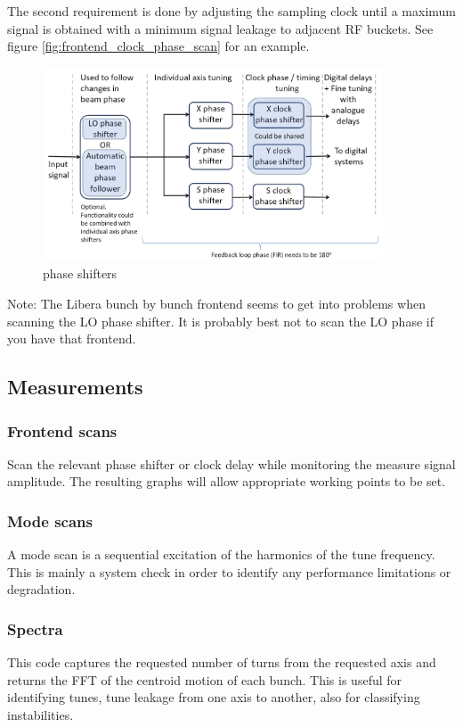 \documentclass{report}
\begin{document}
The second requirement is done by adjusting the sampling clock until a maximum signal is obtained with a minimum signal leakage to adjacent RF buckets. See figure \ref{fig:frontend_clock_phase_scan} for an example.
\begin{figure}[hbt]
    \centering
        \includegraphics[width=0.9\textwidth]{phase_shifters_overview.png}
        \caption{phase shifters}
        \label{fig:phase_shifters}
\end{figure}


Note: The Libera bunch by bunch frontend seems to get into problems when scanning the LO phase shifter. It is probably best not to scan the LO phase if you have that frontend.
\clearpage
\subsection{Measurements}
\subsubsection{Frontend scans}
Scan the relevant phase shifter or clock delay while monitoring the measure signal amplitude. The resulting graphs will allow appropriate working points to be set.

\subsubsection{Mode scans}
A mode scan is a sequential excitation of the harmonics of the tune frequency. This is mainly a system check in order to identify any performance limitations or degradation.

\subsubsection{Spectra}
This code captures the requested number of turns from the requested axis and returns the FFT of the centroid motion of each bunch. This is useful for identifying tunes, tune leakage from one axis to another, also for classifying instabilities.
\end{document}
